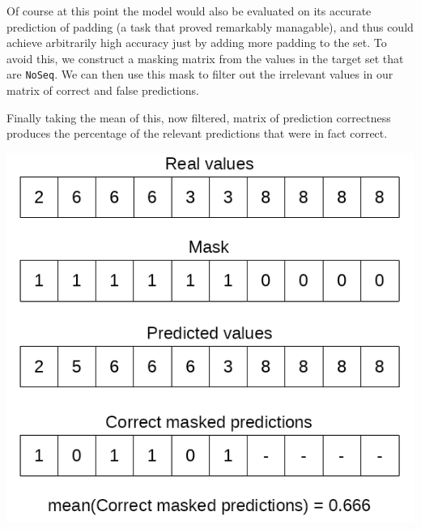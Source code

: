 \begin{multicols}{2}
Of course at this point the model would also be evaluated on its accurate prediction of padding (a task that proved remarkably managable), and thus could achieve arbitrarily high accuracy just by adding more padding to the set. To avoid this, we construct a masking matrix from the values in the target set that are \texttt{NoSeq}. We can then use this mask to filter out the irrelevant values in our matrix of correct and false predictions.

Finally taking the mean of this, now filtered, matrix of prediction correctness produces the percentage of the relevant predictions that were in fact correct.
\begin{Figure}
 \centering
 \includegraphics[width=0.8\linewidth]{../graphs/accuracy}
 \captionsetup{width=0.8\linewidth, font=small}
\end{Figure}


\end{multicols}
